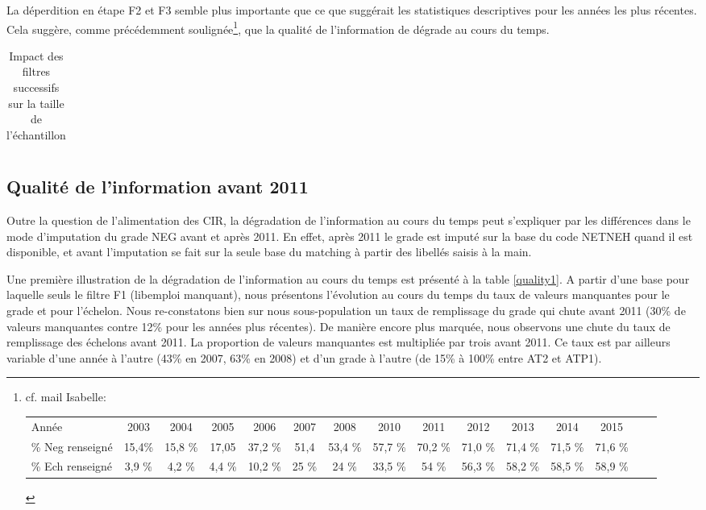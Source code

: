 \documentclass[11pt,a4paper]{article}
\begin{document}
La déperdition en étape F2 et F3 semble plus importante que ce que suggérait les statistiques descriptives pour les années les plus récentes. Cela suggère, comme précédemment soulignée\footnote{cf. mail Isabelle:  \\
\scriptsize
\begin{tabular}{lcccccccccccccc}
Année &2003&	2004 &	2005&	2006&	2007&	2008	&2010	&2011	&2012	&2013	&2014	&2015 \\
\% Neg renseigné & 15,4\%&	15,8 \% &	17,05	& 37,2 \%	&51,4 &	53,4 \% &	57,7 \%&	70,2 \%&	71,0 \% & 	71,4 \%	&71,5 \%&	71,6 \% \\
\% Ech renseigné &  3,9 \%	& 4,2 \%&	4,4 \%	&10,2 \% 	&25 \%	&24 \%	&33,5 \% &	54 \%&	56,3 \%&	58,2 \%	&58,5 \%	&58,9 \% \\
\end{tabular}
}, que la qualité de l'information de dégrade au cours du temps. 


\begin{table}[h!]
\centering
\caption{Impact des filtres successifs sur la taille de l'échantillon} 
\label{filters_AT}
\begin{tabular}{lcc}
\toprule

\bottomrule
\end{tabular}
\end{table}



\subsection{Qualité de l'information avant 2011}

Outre la question de l'alimentation des CIR, la dégradation de l'information au cours du temps peut s'expliquer par les différences dans le mode d'imputation du grade NEG avant et après 2011. En effet, après 2011 le grade est imputé sur la base du code NETNEH quand il est disponible, et avant l'imputation se fait sur la seule base du matching à partir des libellés saisis à la main. 

Une première illustration de la dégradation de l'information au cours du temps est présenté à la table \ref{quality1}. A partir d'une base pour laquelle seuls le filtre F1 (libemploi manquant), nous présentons l'évolution au cours du temps du taux de valeurs manquantes pour le grade et pour l'échelon. 
Nous re-constatons bien sur nous sous-population un taux de remplissage du grade qui chute avant 2011 (30\% de valeurs manquantes contre 12\% pour les années plus récentes). De manière encore plus marquée, nous observons une chute du taux de remplissage des échelons avant 2011. La proportion de valeurs manquantes est multipliée par trois avant 2011. Ce taux est par ailleurs variable d'une année à l'autre (43\% en 2007, 63\% en 2008) et d'un grade à l'autre (de 15\% à 100\% entre AT2 et ATP1). 
\end{document}
